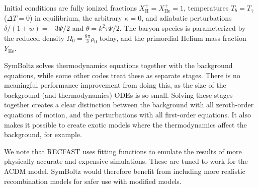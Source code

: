 \documentclass{aa}
\newcommand{\LCDM}{$\mathrm{\Lambda C D M}$}
\newcommand\Hy{\mathrm{H}}
\newcommand\He{\mathrm{He}}
\begin{document}
Initial conditions are fully ionized fractions $X_\Hy^+ = X_\He^+ = 1$, temperatures $T_b = T_\gamma$ ($\Delta T = 0$) in equilibrium, the arbitrary $\kappa = 0$, and adiabatic perturbations $\delta/(1+w) = -3 \Psi / 2$ and $\theta = k^2 \tau \Psi / 2$.
The baryon species is parameterized by the reduced density $\Omega_0 = \frac{8\pi}{3}\rho_0$ today, and the primordial Helium mass fraction $Y_\He$.

SymBoltz solves thermodynamics equations together with the background equations, while some other codes treat these as separate stages.
There is no meaningful performance improvement from doing this, as the size of the background (and thermodynamics) ODEs is so small.
Solving these stages together creates a clear distinction between the background with all zeroth-order equations of motion, and the perturbations with all first-order equations.
It also makes it possible to create exotic models where the thermodynamics affect the background, for example.

We note that RECFAST uses fitting functions to emulate the results of more physically accurate and expensive simulations.
These are tuned to work for the \LCDM{} model.
SymBoltz would therefore benefit from including more realistic recombination models for safer use with modified models.
\end{document}
